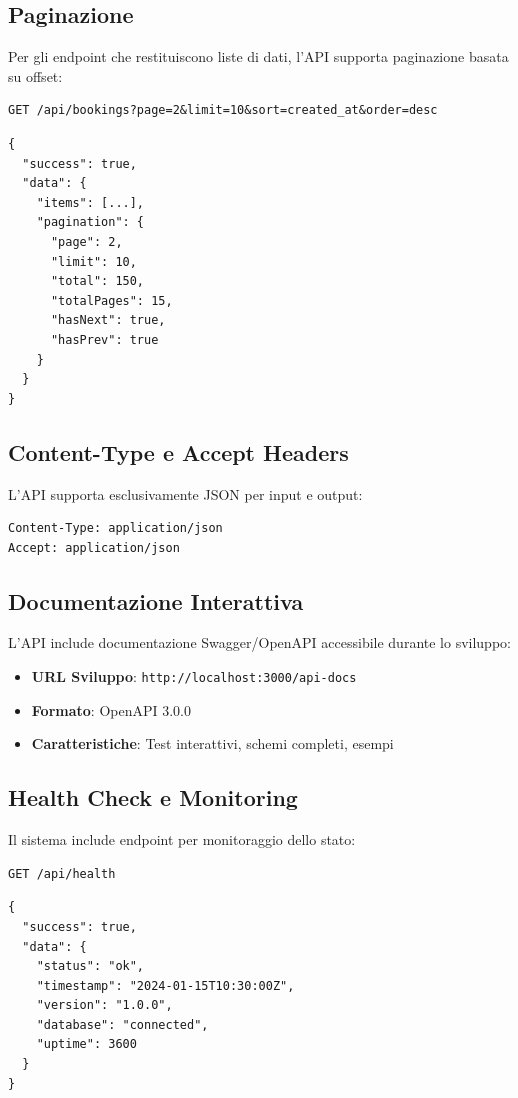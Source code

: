 \newpage

\subsection{Paginazione}
Per gli endpoint che restituiscono liste di dati, l'API supporta paginazione basata su offset:

\begin{lstlisting}[style=httpstyle, caption=Parametri di Paginazione]
GET /api/bookings?page=2&limit=10&sort=created_at&order=desc
\end{lstlisting}

\begin{lstlisting}[caption=Risposta con Metadati di Paginazione]
{
  "success": true,
  "data": {
    "items": [...],
    "pagination": {
      "page": 2,
      "limit": 10,
      "total": 150,
      "totalPages": 15,
      "hasNext": true,
      "hasPrev": true
    }
  }
}
\end{lstlisting}

\subsection{Content-Type e Accept Headers}
L'API supporta esclusivamente JSON per input e output:

\begin{lstlisting}[style=httpstyle, caption=Headers Richiesti]
Content-Type: application/json
Accept: application/json
\end{lstlisting}

\subsection{Documentazione Interattiva}
L'API include documentazione Swagger/OpenAPI accessibile durante lo sviluppo:

\begin{itemize}
    \item \textbf{URL Sviluppo}: \texttt{http://localhost:3000/api-docs}
    \item \textbf{Formato}: OpenAPI 3.0.0
    \item \textbf{Caratteristiche}: Test interattivi, schemi completi, esempi
\end{itemize}

\subsection{Health Check e Monitoring}
Il sistema include endpoint per monitoraggio dello stato:

\begin{lstlisting}[style=httpstyle, caption=Health Check Endpoint]
GET /api/health
\end{lstlisting}

\begin{lstlisting}[caption=Risposta Health Check]
{
  "success": true,
  "data": {
    "status": "ok",
    "timestamp": "2024-01-15T10:30:00Z",
    "version": "1.0.0",
    "database": "connected",
    "uptime": 3600
  }
}
\end{lstlisting}